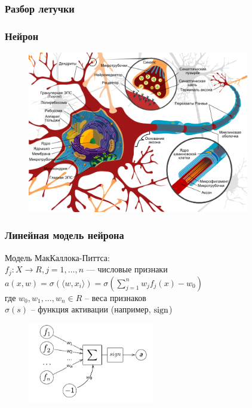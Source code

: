 \documentclass[12pt]{beamer}
\subtitle{Лекция 11. Нейронные сети.}
\begin{document}
	
\frame{\titlepage}

\begin{frame}\frametitle{Разбор летучки}

\end{frame}

\begin{frame}\frametitle{Нейрон}
\begin{figure}[htbp]
  \includegraphics[height=200pt, keepaspectratio = true]{images/neuron}   
\end{figure}

\end{frame}


\begin{frame}\frametitle{Линейная модель нейрона}
Модель МакКаллока-Питтса:\\
$f_j: X \rightarrow R, j = 1,\dots, n$ — числовые признаки\\
$a(x,w) = \sigma(\langle w, x_i \rangle) = \sigma(\sum\limits_{j=1}^n w_j f_j(x) - w_0)$\\
где $w_0, w_1, \dots,w_n \in R$ -- веса признаков\\
$\sigma(s)$ -- функция активации (например, $\operatorname{sign}$)

\begin{figure}[htbp]
  \includegraphics[height=100pt, keepaspectratio = true]{images/neuron-scheme}   
\end{figure}

\end{frame}
\end{document}
